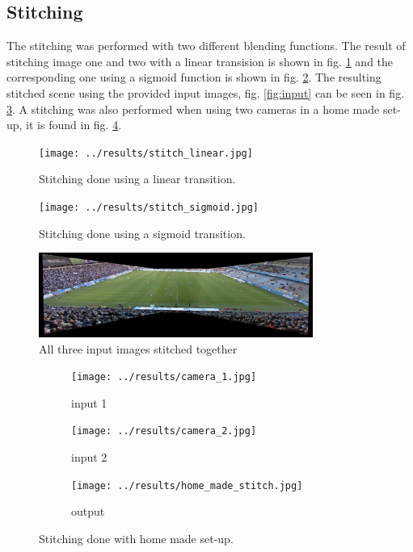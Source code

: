 \subsection{Stitching}
The stitching was performed with two different blending functions. The result of stitching image one and two with a linear transision is shown in fig. \ref{fig:results:stitching:linear} and the corresponding one using a sigmoid function is shown in fig. \ref{fig:results:stitching:sigmoid}. The resulting stitched scene using the provided input images, fig. \ref{fig:input} can be seen in fig. \ref{fig:res_stitch}. A stitching was also performed when using two cameras in a home made set-up, it is found in fig. \ref{fig:results:stitching:homemade}.

\begin{figure}[H]
  \centering
  \texttt{[image: ../results/stitch\_linear.jpg]}
  \caption{Stitching done using a linear transition.}
  \label{fig:results:stitching:linear}
\end{figure}

\begin{figure}[H]
  \centering
  \texttt{[image: ../results/stitch\_sigmoid.jpg]}
  \caption{Stitching done using a sigmoid transition.}
  \label{fig:results:stitching:sigmoid}
\end{figure}

\begin{figure}
	\centering
	\includegraphics[width=0.8\textwidth]{../results/images/res_stitch.PNG}
	\caption{All three input images stitched together}
	\label{fig:res_stitch}
\end{figure}

\begin{figure}
	\centering
	\begin{subfigure}[t]{0.3\textwidth}
		\centering
		\texttt{[image: ../results/camera\_1.jpg]}
		\caption{input 1}
	\end{subfigure}
	\begin{subfigure}[t]{0.3\textwidth}
		\centering
		\texttt{[image: ../results/camera\_2.jpg]}
		\caption{input 2}
	\end{subfigure}
		\begin{subfigure}[t]{0.3\textwidth}
		\centering
                \texttt{[image: ../results/home\_made\_stitch.jpg]}
		\caption{output}
	\end{subfigure}
        \caption{Stitching done with home made set-up.}
	\label{fig:results:stitching:homemade}
\end{figure}
